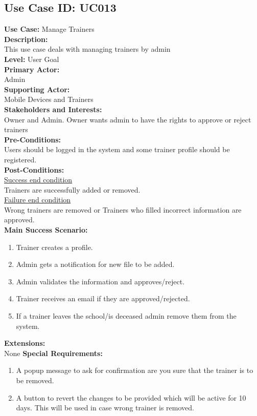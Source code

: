 \documentclass{report}
\begin{document}
\subsection{\textbf{Use Case ID:} UC013}
\textbf{Use Case:} Manage Trainers\\[0.3cm]
\textbf{Description:}\\
This use case deals with managing trainers by admin\\[0.3cm]
\textbf{Level:} User Goal\\[0.3cm]
\textbf{Primary Actor:}\\
Admin\\[0.3cm]
\textbf{Supporting Actor:}\\
Mobile Devices and Trainers\\[0.3cm]
\textbf{Stakeholders and Interests:}\\
Owner and  Admin. Owner wants admin to have the rights to approve or reject trainers\\[0.4cm]
\textbf{Pre-Conditions:}\\
Users should be logged in the system and some trainer profile should be registered.\\[0.3cm]
\textbf{Post-Conditions:}\\
\underline{Success end condition}\\
Trainers are successfully added or removed.\\[0.3cm]
\underline{Failure end condition}\\
Wrong trainers are removed or Trainers who filled incorrect information are approved.\\[0.3cm]
\textbf{\large {Main Success Scenario:}}
\begin{enumerate}
    \item Trainer creates a profile.
    \item Admin gets a notification for new file to be added.
    \item Admin validates the information and approves/reject.
    \item Trainer receives an email if they are approved/rejected.
    \item If a trainer leaves the school/is deceased admin remove them from the system.
\end{enumerate}
\textbf{Extensions:}\\
None
\textbf{Special Requirements:}
\begin{enumerate}
    \item A popup message to ask for confirmation are you sure that the trainer is to be removed.
    \item A button to revert the changes to be provided which will be active for 10 days. This will be used in case wrong trainer is removed.
\end{enumerate}
\end{document}
